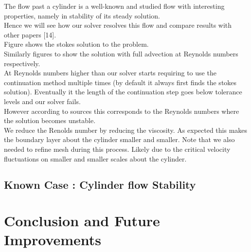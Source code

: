 \documentclass[11pt,twoside,a4paper]{article}
\begin{document}
The flow past a cylinder is a well-known and studied flow with interesting properties, namely in stability of its steady solution.\\
Hence we will see how our solver resolves this flow and compare results with other papers [14].\\

Figure shows the stokes solution to the problem.\\
Similarly figures to show the solution with full advection at Reynolds numbers respectively.\\
At Reynolds numbers higher than our solver starts requiring to use the continuation method multiple times (by default it always first finds the stokes solution). Eventually it the length of the continuation step goes below tolerance levels and our solver fails.\\
However according to sources this corresponds to the Reynolds numbers where the solution becomes unstable.\\
We reduce the Renolds number by reducing the viscosity. As expected this makes the boundary layer about the cylinder smaller and smaller. Note that we also needed to refine mesh during this process. Likely due to the critical velocity fluctuations on smaller and smaller scales about the cylinder. 

\subsection{Known Case : Cylinder flow Stability}

\section{Conclusion and Future Improvements}
\end{document}
